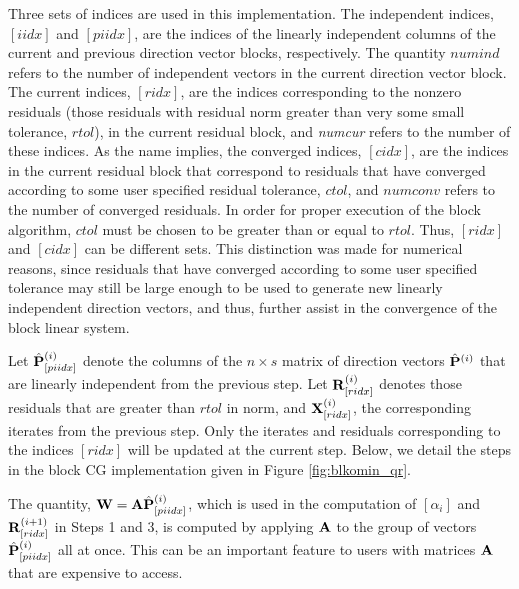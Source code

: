 \documentclass[twoside]{siamltex}
\newcommand{\bA}{{\bf A}}
\newcommand{\bP}{{\bf P}}
\newcommand{\bW}{{\bf W}}
\newcommand{\bR}{{\bf R}}
\newcommand{\bX}{{\bf X}}
\begin{document}
Three sets of indices are used in this implementation. The
independent indices, $[iidx]$ and $[piidx]$, are the indices of
the linearly independent columns of the current and previous
direction vector blocks, respectively. The quantity $numind$
refers to the number of independent vectors in the current
direction vector block. The current indices, $[ridx]$, are the
indices corresponding to the nonzero residuals (those residuals
with residual norm greater than very some small tolerance,
$rtol$), in the current residual block, and {\it numcur} refers to
the number of these indices.  As the name implies, the converged
indices, $[cidx]$, are the indices in the current residual block
that correspond to residuals that have converged according to some
user specified residual tolerance, $ctol$, and $numconv$ refers to
the number of converged residuals. In order for proper execution
of the block algorithm, $ctol$ must be chosen to be greater than
or equal to $rtol$. Thus, $[ridx]$ and $[cidx]$ can be different
sets. This distinction was made for numerical reasons, since
residuals that have converged according to some user specified
tolerance may still be large enough to be used to generate new
linearly independent direction vectors, and thus, further assist
in the convergence of the block linear system.

Let ${\hat \bP}^{(i)}_{[piidx]}$ denote the columns of the $n
\times s$ matrix of direction vectors ${\hat \bP}^{(i)}$ that are
linearly independent from the previous step. Let
$\bR^{(i)}_{[ridx]}$ denotes those residuals that are greater than
$rtol$ in norm, and $\bX_{[ridx]}^{(i)}$, the corresponding
iterates from the previous step. Only the iterates and residuals
corresponding to the indices $[ridx]$ will be updated at the
current step. Below, we detail the steps in the block CG
implementation given in Figure \ref{fig:blkomin_qr}.

The quantity, $\bW = \bA {\hat \bP}_{[piidx]}^{(i)}$, which is
used in the computation of $[\alpha_i]$ and $\bR_{[ridx]}^{(i+1)}$
in Steps 1 and 3, is computed by applying $\bA$ to the group of
vectors ${\hat \bP}_{[piidx]}^{(i)}$ all at once. This can be an
important feature to users with matrices $\bA$ that are expensive
to access.
\end{document}
